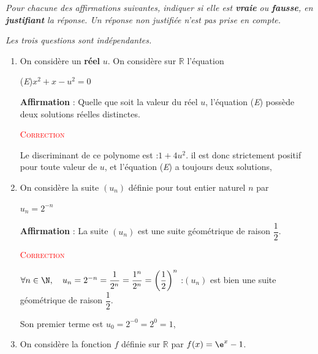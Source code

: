 \textit{Pour chacune des affirmations suivantes, indiquer si elle est \textbf{vraie} ou \textbf{fausse}, en \textbf{justifiant} la réponse. Un réponse non justifiée n'est pas prise en compte.}

\begin{center}
	\textit{Les trois questions sont indépendantes.}
\end{center}

\begin{enumerate}
	\item On considère un \textbf{réel} $u$. On considère sur $\mathbb{R}$ l'équation

	\begin{center}
		(\textit{E})\hspace{10mm}\mbox{$x^2+x-u^2=0$}
		\end{center}

		\textbf{Affirmation} : Quelle que soit la valeur du réel $u$, l'équation (\textit{E}) possède deux solutions réelles distinctes.


		\textcolor{red}{\textsc{Correction}}


		Le discriminant de ce polynome est :\quad \mbox{$1+4u^2$}.
		il est donc strictement positif pour toute valeur de $u$, et l'équation (\textit{E}) a toujours deux solutions,

		\hfill {}

		\item On considère la suite \mbox{$(u_n)$} définie pour tout entier naturel $n$ par

		\begin{center}
			\mbox{$u_n=2^{-n}$}
		\end{center}

		\textbf{Affirmation} : La suite \mbox{$(u_n)$} est une suite géométrique de raison \mbox{$\dfrac12$}.


		\textcolor{red}{\textsc{Correction}}


		\mbox{$\forall n\in\N, \quad u_n=2^{-n}=\dfrac{1}{2^n}=\dfrac{1^n}{2^n}=\left(\dfrac{1}{2}\right) ^n$} :\quad \mbox{$(u_n)$} est bien une suite géométrique de raison \mbox{$\dfrac12$}.

		Son premier terme est \quad $u_0 = 2^{-0} = 2^0 = 1$,

		\hfill {}

		\item On considère la fonction $f$ définie sur $\mathbb{R}$ par \mbox{$f(x)=\e^x-1$}.


\end{enumerate}
